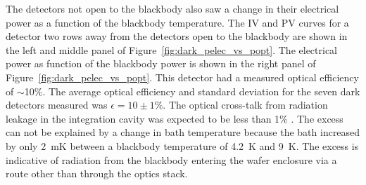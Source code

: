 
The detectors not open to the blackbody also saw a change in their electrical power as a function of the blackbody temperature. 
The IV and PV curves for a detector two rows away from the detectors open to the blackbody are shown in the left and middle panel of Figure~\ref{fig:dark_pelec_vs_popt}. 
The electrical power as function of the blackbody power is shown in the right panel of Figure~\ref{fig:dark_pelec_vs_popt}. 
This detector had a measured optical efficiency of $\sim$10\%. 
The average optical efficiency and standard deviation for the seven dark detectors measured was $\epsilon=10\pm1\%$. 
The optical cross-talk from radiation leakage in the integration cavity was expected to be less than 1\% \cite{Dobbs2011}.
The excess can not be explained by a change in bath temperature because the bath increased by only 2~mK between a blackbody temperature of 4.2~K and 9~K. 
The excess is indicative of radiation from the blackbody entering the wafer enclosure via a route other than through the optics stack.

